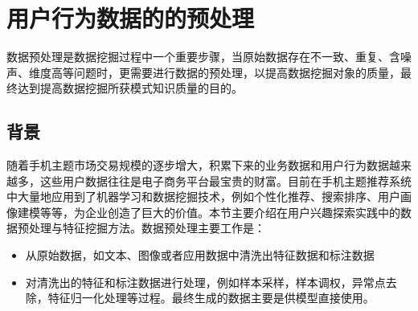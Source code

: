 \section{用户行为数据的的预处理}
数据预处理是数据挖掘过程中一个重要步骤，当原始数据存在不一致、重复、含噪声、维度高等问题时，更需要进行数据的预处理，以提高数据挖掘对象的质量，最终达到提高数据挖掘所获模式知识质量的目的。
  \subsection{背景}
  随着手机主题市场交易规模的逐步增大，积累下来的业务数据和用户行为数据越来越多，这些用户数据往往是电子商务平台最宝贵的财富。目前在手机主题推荐系统中大量地应用到了机器学习和数据挖掘技术，例如个性化推荐、搜索排序、用户画像建模等等，为企业创造了巨大的价值。本节主要介绍在用户兴趣探索实践中的数据预处理与特征挖掘方法。数据预处理主要工作是：
  \begin{itemize}
  \item 从原始数据，如文本、图像或者应用数据中清洗出特征数据和标注数据
  \item 对清洗出的特征和标注数据进行处理，例如样本采样，样本调权，异常点去除，特征归一化处理等过程。最终生成的数据主要是供模型直接使用。
  \end{itemize}

